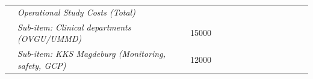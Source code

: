 \begin{table}[]
\begin{tabular}{llllrrrrcrrrrrr}
\rowcolor[HTML]{0070C0} 
{\color[HTML]{FFFFFF} \textbf{}}                         & \multicolumn{2}{l}{\cellcolor[HTML]{0070C0}\textit{Operational Study Costs (Total)}}                            &                                                   & \multicolumn{1}{l}{\cellcolor[HTML]{0070C0}}          & \multicolumn{1}{l}{\cellcolor[HTML]{0070C0}\textit{}} & \multicolumn{1}{l}{\cellcolor[HTML]{0070C0}\textit{}} & \multicolumn{1}{l}{\cellcolor[HTML]{0070C0}\textit{}} & {\color[HTML]{FFFFFF} \textit{\textbf{}}}             & {\color[HTML]{FFFFFF} \textit{\textbf{}}}                      & {\color[HTML]{FFFFFF} \textbf{}}                               & \multicolumn{1}{l}{\cellcolor[HTML]{0070C0}\textit{}} & {\color[HTML]{FFFFFF} \textit{\textbf{}}}             & {\color[HTML]{FFFFFF} \textit{\textbf{}}}                         & {\color[HTML]{FFFFFF} \textit{\textbf{}}}                      \\
                                                         & \multicolumn{2}{l}{\cellcolor[HTML]{FFFF99}\textit{Sub-item: Clinical departments (OVGU/UMMD)}}                 & \multicolumn{1}{r}{\cellcolor[HTML]{FFFF99}15000} & \cellcolor[HTML]{FFFF99}                              & \multicolumn{1}{l}{\cellcolor[HTML]{FFFF99}\textit{}} & \multicolumn{1}{l}{\textit{}}                         & \multicolumn{1}{l}{\textit{}}                         & \multicolumn{1}{l}{\cellcolor[HTML]{FFFF99}\textit{}} & \multicolumn{1}{l}{\cellcolor[HTML]{92D050}\textit{}}          & \multicolumn{1}{l}{\cellcolor[HTML]{FFFF99}\textit{}}          & \multicolumn{1}{l}{\cellcolor[HTML]{92D050}\textit{}} & \multicolumn{1}{l}{\cellcolor[HTML]{FFFF99}\textit{}} & \multicolumn{1}{l}{\cellcolor[HTML]{BFBFBF}\textit{\textbf{}}}    & \multicolumn{1}{l}{\textit{\textbf{}}}                         \\
\rowcolor[HTML]{B9CDE5} 
\textbf{}                                                & \multicolumn{2}{l}{\cellcolor[HTML]{B9CDE5}\textit{Sub-item: KKS Magdeburg (Monitoring, safety, GCP)}}          & \multicolumn{1}{r}{\cellcolor[HTML]{B9CDE5}12000} &                                                       & \multicolumn{1}{l}{\cellcolor[HTML]{B9CDE5}\textit{}} & \multicolumn{1}{l}{\cellcolor[HTML]{B9CDE5}\textit{}} & \multicolumn{1}{l}{\cellcolor[HTML]{B9CDE5}\textit{}} & \multicolumn{1}{l}{\cellcolor[HTML]{B9CDE5}\textit{}} & \multicolumn{1}{l}{\cellcolor[HTML]{C6D9F1}\textit{\textbf{}}} & \multicolumn{1}{l}{\cellcolor[HTML]{C6D9F1}\textit{\textbf{}}} & \multicolumn{1}{l}{\cellcolor[HTML]{C6D9F1}\textit{}} & \multicolumn{1}{l}{\cellcolor[HTML]{C6D9F1}\textit{}} & \multicolumn{1}{l}{\cellcolor[HTML]{92D050}\textit{\textbf{}}}    & \multicolumn{1}{l}{\cellcolor[HTML]{92D050}\textit{\textbf{}}} \\

\end{tabular}
\end{table}
